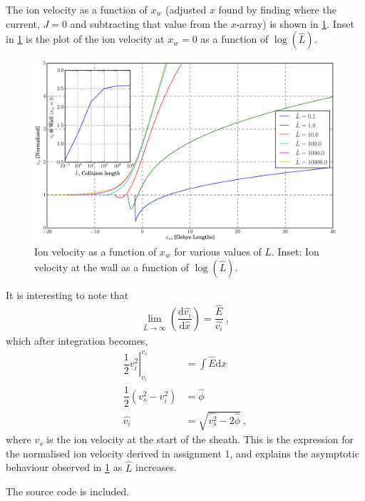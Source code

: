 \documentclass[10pt,a4paper]{article}
\begin{document}
	The ion velocity as a function of $x_{w}$ (adjusted $x$ found by finding where the current, $J = 0$ and subtracting that value from the $x$-array) is shown in \cref{fig:1}. Inset in \cref{fig:1} is the plot of the ion velocity at $x_{w} = 0$ as a function of $\log\left(\hat{L}\right)$.
	\begin{figure}
		\includegraphics[width=\textwidth]{collisions.eps}
		\caption{Ion velocity as a function of $x_{w}$ for various values of $L$. Inset: Ion velocity at the wall as a function of $\log\left(\hat{L}\right)$.}
		\label{fig:1}
	\end{figure}
	
	It is interesting to note that 
	\begin{align}
		\lim\limits_{\hat{L} \rightarrow \infty} \left(\dfrac{\mathrm{d} \hat{v_{i}}}{\mathrm{d} \hat{x}} \right) = \dfrac{\hat{E}}{\hat{v_{i}}}~,
	\end{align}
	which after integration becomes,
	\begin{align}
		\left. \dfrac{1}{2} v_{i}^{2} \right|_{v_{i}}^{v_{s}} &= \int\hat{E}\mathrm{d}x \nonumber\\
		\dfrac{1}{2} \left(v_{s}^{2} - v_{i}^{2}\right) &= \hat{\phi}\\
		\hat{v_{i}} &= \sqrt{\hat{v_{s}^{2}} - 2 \hat{\phi}}~,
	\end{align}
	where $v_{s}$ is the ion velocity at the start of the sheath. This is the expression for the normalised ion velocity derived in assignment 1, and explains the asymptotic behaviour observed in \cref{fig:1} as $\hat{L}$ increases.
	
	The source code is included.
	\inputminted[linenos = true,
	breaklines, 
	breakanywhere]{python}{dcg513_3.py}
\end{document}

